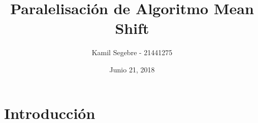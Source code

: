 \documentclass[spanish]{apa}
\title{Paralelisación de Algoritmo Mean Shift}
\date{Junio 21, 2018}
\author{Kamil Segebre - 21441275}
\begin{document}
\maketitle
\newpage

\section{Introducción}
\paragraph{}
\end{document}
